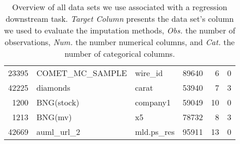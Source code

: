 \begin{table}[h!]
\begin{tabular}{rllrrr}
     23395 &     COMET\_MC\_SAMPLE &   wire\_id &     89640 &                6 &                0 \\
     42225 &            diamonds &    carat &    53940 &                7 &                3 \\
      1200 &          BNG(stock) &  company1 &      59049 &               10 &                0 \\
      1213 &             BNG(mv) &    x5 &    78732 &                8 &                3 \\
     42669 &          auml\_url\_2 &   mld.ps\_res &     95911 &               13 &                0 \\
\bottomrule
\end{tabular}
\caption{Overview of all data sets we use associated with a regression downstream task. \emph{Target Column} presents the data set's column we used to evaluate the imputation methods, \emph{Obs.} the number of observations, \emph{Num.} the number numerical columns, and \emph{Cat.} the number of categorical columns.}
\label{tab:regression_data}
\end{table}
